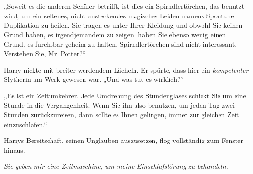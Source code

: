 „Soweit es die anderen Schüler betrifft, ist dies ein Spirndlertörchen, das benutzt wird, um ein seltenes, nicht ansteckendes magisches Leiden namens Spontane Duplikation zu heilen. Sie tragen es unter Ihrer Kleidung und obwohl Sie keinen Grund haben, es irgendjemandem zu zeigen, haben Sie ebenso wenig einen Grund, es furchtbar geheim zu halten. Spirndlertörchen sind nicht interessant. Verstehen Sie, Mr~Potter?“%

Harry nickte mit breiter werdendem Lächeln. Er spürte, dass hier ein \emph{kompetenter} Slytherin am Werk gewesen war.
„Und was tut es wirklich?“

„Es ist ein Zeitumkehrer. Jede Umdrehung des Stundenglases schickt Sie um eine Stunde in die Vergangenheit. Wenn Sie ihn also benutzen, um jeden Tag zwei Stunden zurückzureisen, dann sollte es Ihnen gelingen, immer zur gleichen Zeit einzuschlafen.“

Harrys Bereitschaft, seinen Unglauben auszusetzen, flog vollständig zum Fenster hinaus.

\emph{Sie geben mir eine Zeitmaschine, um meine Einschlafstörung zu behandeln.}

